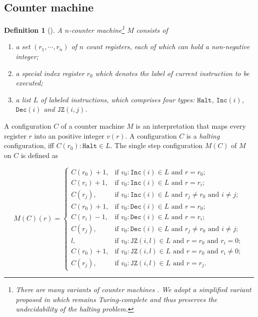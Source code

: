\documentclass[review]{elsarticle}
\newcommand{\inc}[1][]{\mathtt{Inc}(#1)}
\newcommand{\dec}[1][]{\mathtt{Dec}(#1)}
\newcommand{\jumpZero}[1][]{\mathtt{JZ}(#1)}
\newcommand{\halt}{\mathtt{Halt}}
\newtheorem{definition}{Definition}
\begin{document}
	\subsection{Counter machine}
	\begin{definition}[\cite{Min1967}] \rm \label{def:countMach}
		A \textit{$n$-counter machine}\footnote{There are many variants of counter machines \cite{Her1954,Ers1958,Pet1958,Min1961}. We adopt a simplified variant proposed in \cite{Min1967} which remains Turing-complete and thus preserves the undecidability of the halting problem.} $M$ consists of
		\begin{enumerate}
			\item a set $(r_1, \cdots, r_n)$ of $n$ count registers, each of which can hold a non-negative integer;
			
			\item a special index register $r_0$ which denotes the label of current instruction to be executed;
			
			\item a list $L$ of labeled instructions, which comprises four types: $\halt$, $\inc[i]$, $\dec[i]$ and $\jumpZero[i, j]$.
		\end{enumerate}
	\end{definition}
	
	A configuration $C$ of a counter machine $M$ is an interpretation that maps every register $r$ into an positive integer $v(r)$.
	A configuration $C$ is a \textit{halting} configuration, iff $C(r_0): \halt \in L$.
	The single step configuration $M(C)$ of $M$ on $C$ is defined as 
		
	\[M(C)(r) =
	\begin{cases}
		C(r_0) + 1, & \text{if } v_0: \inc[i] \in L \text{ and } r = r_0; \\
		C(r_i) + 1, & \text{if } v_0: \inc[i] \in L \text{ and } r = r_i; \\
		C(r_j), & \text{if } v_0: \inc[i] \in L \text{ and } r_j \neq r_0 \text{ and } i \neq j; \\
		
		C(r_0) + 1, & \text{if } v_0: \dec[i] \in L \text{ and } r = r_0; \\
		C(r_i) - 1, & \text{if } v_0: \dec[i] \in L \text{ and } r = r_i; \\
		C(r_j), & \text{if } v_0: \dec[i] \in L \text{ and } r_j \neq r_0 \text{ and } i \neq j; \\
		
		l, & \text{if } v_0: \jumpZero[i, l] \in L \text{ and } r = r_0 \text{ and } r_i = 0; \\
		C(r_0) + 1, & \text{if } v_0: \jumpZero[i, l] \in L \text{ and } r = r_0 \text{ and } r_i \neq 0; \\
		C(r_j), & \text{if } v_0: \jumpZero[i, l] \in L \text{ and } r = r_j.
	\end{cases}\]
	
\end{document}
